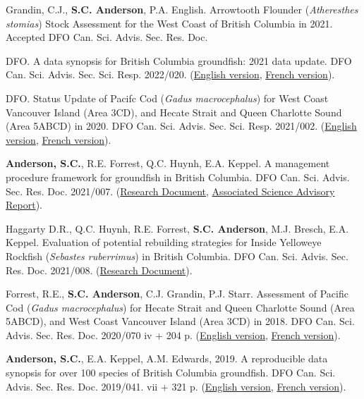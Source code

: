 \begin{description}
\tightlist
\item[2022]
Grandin, C.J., \textbf{S.C. Anderson}, P.A. English. Arrowtooth Flounder
(\emph{Atheresthes stomias}) Stock Assessment for the West Coast of
British Columbia in 2021. Accepted DFO Can. Sci. Advis. Sec. Res. Doc.
\item[2022]
DFO. A data synopsis for British Columbia groundfish: 2021 data update.
DFO Can. Sci. Advis. Sec. Sci. Resp. 2022/020.
(\href{https://www.dfo-mpo.gc.ca/csas-sccs/Publications/ScR-RS/2022/2022_020-eng.html}{English
version},
\href{https://www.dfo-mpo.gc.ca/csas-sccs/Publications/ScR-RS/2022/2022_020-fra.html}{French
version}).
\item[2021]
DFO. Status Update of Pacifc Cod (\emph{Gadus macrocephalus}) for West
Coast Vancouver Island (Area 3CD), and Hecate Strait and Queen Charlotte
Sound (Area 5ABCD) in 2020. DFO Can. Sci. Advis. Sec. Sci. Resp.
2021/002.
(\href{https://www.dfo-mpo.gc.ca/csas-sccs/Publications/ResDocs-DocRech/2021/2021_007-eng.html}{English
version},
\href{https://www.dfo-mpo.gc.ca/csas-sccs/Publications/ResDocs-DocRech/2021/2021_007-fra.html}{French
version}).
\item[2021]
\textbf{Anderson, S.C.}, R.E. Forrest, Q.C. Huynh, E.A. Keppel. A
management procedure framework for groundﬁsh in British Columbia. DFO
Can. Sci. Advis. Sec. Res. Doc. 2021/007.
(\href{https://www.dfo-mpo.gc.ca/csas-sccs/Publications/ResDocs-DocRech/2021/2021_007-eng.html}{Research
Document},
\href{https://www.dfo-mpo.gc.ca/csas-sccs/Publications/SAR-AS/2021/2021_002-eng.html}{Associated
Science Advisory Report}).
\item[2021]
Haggarty D.R., Q.C. Huynh, R.E. Forrest, \textbf{S.C. Anderson}, M.J.
Bresch, E.A. Keppel. Evaluation of potential rebuilding strategies for
Inside Yelloweye Rockfish (\emph{Sebastes ruberrimus}) in British
Columbia. DFO Can. Sci. Advis. Sec. Res. Doc. 2021/008.
(\href{https://www.dfo-mpo.gc.ca/csas-sccs/Publications/ResDocs-DocRech/2021/2021_008-eng.html}{Research
Document}).
\item[2020]
Forrest, R.E., \textbf{S.C. Anderson}, C.J. Grandin, P.J. Starr.
Assessment of Pacific Cod (\emph{Gadus macrocephalus}) for Hecate Strait
and Queen Charlotte Sound (Area 5ABCD), and West Coast Vancouver Island
(Area 3CD) in 2018. DFO Can. Sci. Advis. Sec. Res. Doc. 2020/070 iv +
204 p.
(\href{https://www.dfo-mpo.gc.ca/csas-sccs/Publications/ResDocs-DocRech/2020/2020_070-eng.html}{English
version},
\href{https://www.dfo-mpo.gc.ca/csas-sccs/Publications/ResDocs-DocRech/2020/2020_070-fra.html}{French
version}).
\item[2019]
\textbf{Anderson, S.C.}, E.A. Keppel, A.M. Edwards, 2019. A reproducible
data synopsis for over 100 species of British Columbia groundfish. DFO
Can. Sci. Advis. Sec. Res. Doc. 2019/041. vii + 321 p.
(\href{http://www.dfo-mpo.gc.ca/csas-sccs/Publications/ResDocs-DocRech/2019/2019_041-eng.html}{English
version},
\href{http://www.dfo-mpo.gc.ca/csas-sccs/Publications/ResDocs-DocRech/2019/2019_041-fra.html}{French
version}).
\end{description}

